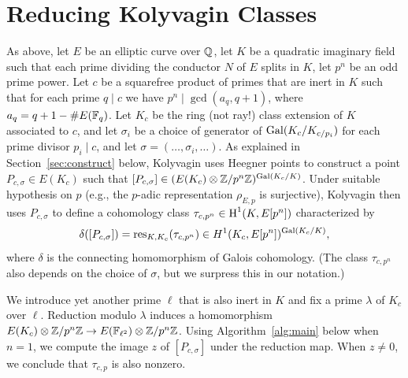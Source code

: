 \documentclass{article} \usepackage[active]{srcltx}
\begin{document}
\section{Reducing Kolyvagin Classes}\label{sec:outline}
As above, let $E$ be an elliptic curve over $\mathbb{Q}$, let $K$ be a
quadratic imaginary field such that each prime dividing the conductor
$N$ of $E$ splits in $K$, let $p^n$ be an odd prime power.  Let
$c$ be a squarefree product of primes that are inert in $K$ such that
for each prime $q\mid c$ we have $p^n\mid\gcd(a_q, q+1)$, where $a_q=
q+1-\#E(\mathbb{F}_q)$.  Let $K_c$ be the ring (not ray!) class extension of
$K$ associated to $c$, and let $\sigma_i$ be a choice of generator of
$\operatorname{Gal}(K_{c}/K_{c/p_i})$ for each prime divisor $p_i\mid c$,
and let $\sigma=(\ldots,\sigma_i,\ldots)$. As explained
in Section~\ref{sec:construct} below, Kolyvagin uses Heegner points to
construct a point $P_{c,\sigma}\in E(K_{c})$
such that $[P_{c,\sigma}]\in (E(K_{c})\otimes\mathbb{Z}/p^n\mathbb{Z})^{\operatorname{Gal}(K_c/K)}$.  Under
suitable hypothesis on $p$ (e.g., the $p$-adic representation
$\rho_{E,p}$ is surjective), Kolyvagin then uses $P_{c,\sigma}$ to define
a cohomology class $\tau_{c,p^n}\in\operatorname{H}^1(K,E[p^n])$ characterized by
$$\delta([P_{c,\sigma}]) =\operatorname{res}_{K,K_c}(\tau_{c,p^n}) \in H^1(K_c, E[p^n])^{\operatorname{Gal}(K_c/K)},$$
where $\delta$ is the connecting homomorphism of Galois cohomology.
(The class $\tau_{c,p^n}$ also depends on the choice of $\sigma$, but
we surpress this in our notation.)

We introduce yet another prime $\ell$ that is also inert in $K$ 
and fix a prime $\lambda$ of $K_c$ over $\ell$.   Reduction modulo
$\lambda$ induces a homomorphism 
$E(K_{c})\otimes\mathbb{Z}/p^n\mathbb{Z} \to E(\mathbb{F}_{\ell^2}) \otimes \mathbb{Z}/p^n\mathbb{Z}$.
Using Algorithm~\ref{alg:main} below when $n=1$, we compute 
the image $z$ of $[P_{c,\sigma}]$ under the reduction map.
When $z\neq 0$, we conclude that $\tau_{c,p}$ is also nonzero.



\vspace{1ex}
\end{document}
